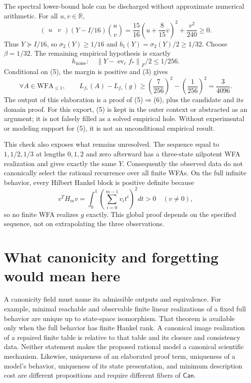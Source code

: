 \documentclass[11pt]{article}
\newcommand{\Cat}[1]{\mathsf{#1}}
\newcommand{\R}{\mathbb R}
\newcommand{\norm}[1]{\left\lVert #1\right\rVert}
\newcommand{\ev}{\operatorname{ev}}
\begin{document}
The spectral lower-bound hole can be discharged without approximate
numerical arithmetic. For all $u,v\in\R$,
\[
 \begin{pmatrix}u&v\end{pmatrix}
 (Y-I/16)\binom uv
 =\frac{15}{16}\left(u+\frac8{15}v\right)^2+\frac{v^2}{240}\geq0.
                                                               \tag{4}
\]
Thus $Y\succeq I/16$, so $\sigma_2(Y)\geq1/16$ and
$b_1(Y)=\sigma_2(Y)/2\geq1/32$. Choose $\beta=1/32$.
The remaining empirical hypothesis is exactly
\[
 h_{\mathrm{noise}}:\quad
 \norm{Y-\ev_c f_*}_F/2\leq1/256.                              \tag{5}
\]
Conditional on (5), the margin is positive and (3) gives
\[
 \forall A\in\mathrm{WFA}_{\leq1},\qquad
 L_{f_*}(A)-L_{f_*}(g)\geq
 \left(\frac7{256}\right)^2-\left(\frac1{256}\right)^2
 =\frac3{4096}.                                                \tag{6}
\]
The output of this elaboration is a proof of (5)$\Rightarrow$(6),
plus the candidate and its domain proof. For this export, (5) is kept
in the outer context or abstracted as an argument; it is not falsely
filled as a solved empirical hole. Without experimental or modeling
support for (5), it is not an unconditional empirical result.

This check also exposes what remains unresolved. The sequence equal to
$1,1/2,1/3$ at lengths $0,1,2$ and zero afterward has a three-state
nilpotent WFA realization and gives exactly the same $Y$.
Consequently the observed data do not canonically select the rational
recurrence over all finite WFAs. On the full infinite behavior, every
Hilbert Hankel block is positive definite because
\[
 v^TH_mv=\int_0^1\left(\sum_{i=0}^{m-1}v_it^i\right)^2dt>0
 \quad(v\ne0),
\]
so no finite WFA realizes $g$ exactly. This global proof depends on the
specified sequence, not on extrapolating the three observations.

\section{What canonicity and forgetting would mean here}

A canonicity field must name its admissible outputs and equivalence.
For example, minimal reachable and observable finite linear realizations
of a fixed full behavior are unique up to state-space isomorphism.
That theorem is available only when the full behavior has finite Hankel
rank. A canonical image realization of a repaired finite table is relative
to that table and its closure and consistency data. Neither statement
makes the proposed rational model a canonical scientific mechanism.
Likewise, uniqueness of an elaborated proof term, uniqueness of a model's
behavior, uniqueness of its state presentation, and minimum description
cost are different propositions and require different fibers of
$\Cat{Can}$.
\end{document}
